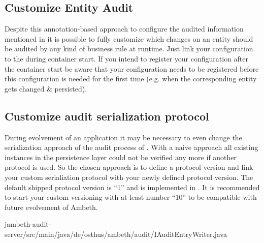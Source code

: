 \subsection{Customize Entity Audit}
Despite this annotation-based approach to configure the audited information mentioned in  it is possible to fully customize which changes on an entity should be audited by any kind of business rule at runtime. Just link your configuration to the  during container start. If you intend to register your configuration after the container start be aware that your configuration needs to be registered before this configuration is needed for the first time (e.g. when the corresponding entity gets changed \& persisted).

\subsection{Customize audit serialization protocol}
During evolvement of an application it may be necessary to even change the serialization approach of the audit process of . With a naive approach all existing  instances in the persistence layer could not be verified any more if another protocol is used. So the chosen approach is to define a protocol version and link your custom serialiation protocol with your newly defined protocol version. The default shipped protocol version is ``1'' and is implemented in . It is recommended to start your custom versioning with at least number ``10'' to be compatible with future evolvement of Ambeth.

	{jambeth-audit-server/src/main/java/de/osthus/ambeth/audit/IAuditEntryWriter.java}